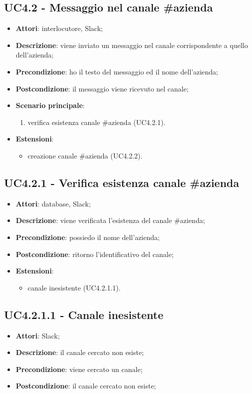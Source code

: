 \documentclass[../AnalisiDeiRequisiti.tex]{subfiles}
\begin{document}
\subsection{UC4.2 - Messaggio nel canale \#azienda} 
\label{sssec:UC4.2} 
\begin{itemize} 
\item \textbf{Attori}: interlocutore, Slack;
\item \textbf{Descrizione}: viene inviato un messaggio nel canale corrispondente a quello dell'azienda;
\item \textbf{Precondizione}: ho il testo del messaggio ed il nome dell'azienda;
\item \textbf{Postcondizione}: il messaggio viene ricevuto nel canale;
\item \textbf{Scenario principale}: \begin{enumerate}\item verifica esistenza canale \#azienda (UC4.2.1). 
 \end{enumerate}
\item \textbf{Estensioni}:\begin{itemize}\item creazione canale \#azienda (UC4.2.2).\end{itemize}
\end{itemize} 
\subsection{UC4.2.1 - Verifica esistenza canale \#azienda} 
\label{sssec:UC4.2.1} 
\begin{itemize} 
\item \textbf{Attori}: database, Slack;
\item \textbf{Descrizione}: viene verificata l'esistenza del canale \#azienda;
\item \textbf{Precondizione}: possiedo il nome dell'azienda;
\item \textbf{Postcondizione}: ritorno l'identificativo del canale;
\item \textbf{Estensioni}:\begin{itemize}\item canale inesistente (UC4.2.1.1).\end{itemize}
\end{itemize} 
\subsection{UC4.2.1.1 - Canale inesistente} 
\label{sssec:UC4.2.1.1} 
\begin{itemize} 
\item \textbf{Attori}: Slack;
\item \textbf{Descrizione}: il canale cercato non esiste;
\item \textbf{Precondizione}: viene cercato un canale;
\item \textbf{Postcondizione}: il canale cercato non esiste;
\end{itemize} 
\end{document}
